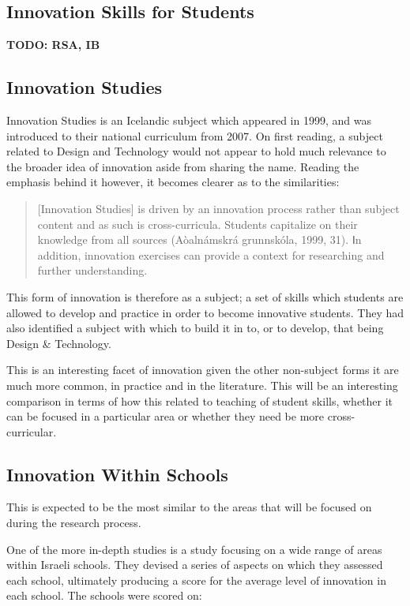 \subsection{Innovation Skills for Students}
\textbf{TODO: RSA, IB}

\subsection{Innovation Studies}
Innovation Studies is an Icelandic subject which appeared in 1999, and was introduced to their national curriculum from 2007. On first reading, a subject related to Design and Technology would not appear to hold much relevance to the broader idea of innovation aside from sharing the name. Reading the emphasis behind it however, it becomes clearer as to the similarities:
\begin{quote}
[Innovation Studies] is driven by an innovation process rather than subject content and as such is cross-curricula. Students capitalize on their knowledge from all sources (Aòalnámskrá grunnskóla, 1999, 31). Ⅰn addition, innovation exercises can provide a context for researching and further understanding.
\end{quote} \cite{thorsteinsson2005innovation}

This form of innovation is therefore as a subject; a set of skills which students are allowed to develop and practice in order to become innovative students. They had also identified a subject with which to build it in to, or to develop, that being Design \& Technology.

This is an interesting facet of innovation given the other non-subject forms it are much more common, in practice and in the literature. This will be an interesting comparison in terms of how this related to teaching of student skills, whether it can be focused in a particular area or whether they need be more cross-curricular.

\subsection{Innovation Within Schools}
This is expected to be the most similar to the areas that will be focused on during the research process.

One of the more in-depth studies is a study focusing on a wide range of areas within Israeli schools. \cite{tubin2003domains} They devised a series of aspects on which they assessed each school, ultimately producing a score for the average level of innovation in each school. The schools were scored on:

